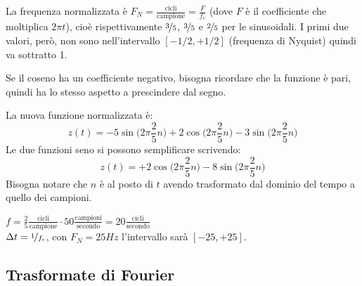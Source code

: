 La frequenza normalizzata è $F_N = \frac{\text{cicli}}{\text{campione}} = \frac{F}{f_c}$ (dove $F$ è il coefficiente che moltiplica $2\pi t$), cioè rispettivamente $\nicefrac{3}{5}$, $\nicefrac{3}{5}$ e $\nicefrac{2}{5}$ per le sinusoidali. I primi due valori, però, non sono nell'intervallo $[-1/2, +1/2]$ (frequenza di Nyquist) quindi va sottratto 1. 

Se il coseno ha un coefficiente negativo, bisogna ricordare che la funzione è pari, quindi ha lo stesso aspetto a prescindere dal segno.

La nuova funzione normalizzata è:
$$z(t) = -5\sin\Big(2\pi \frac{2}{5}n\Big) + 2\cos\Big(2\pi \frac{2}{5}n\Big) - 3\sin\Big(2\pi \frac{2}{5}n\Big)$$
Le due funzioni seno si possono semplificare scrivendo: 
$$z(t) = +2\cos\Big(2\pi \frac{2}{5}n\Big) - 8\sin\Big(2\pi \frac{2}{5}n\Big)$$
Bisogna notare che $n$ è al posto di $t$ avendo trasformato dal dominio del tempo a quello dei campioni. 

$f = \frac{2}{5} \frac{\text{cicli}}{\text{campione}} \cdot 50 \frac{\text{campioni}}{\text{secondo}} = 20 \frac{\text{cicli}}{\text{secondo}}$ \\
$\Delta t = \nicefrac{1}{f_c}$, con $F_N = 25Hz$ l'intervallo sarà $[-25, +25]$.

\subsection{Trasformate di Fourier}
\subsubsection{}







